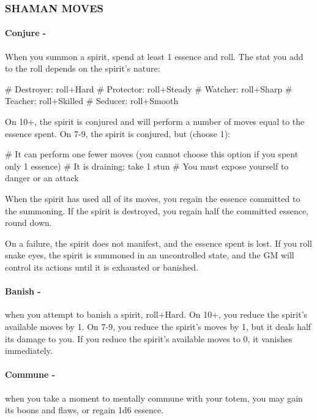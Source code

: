 \subsubsection{SHAMAN MOVES}
\paragraph{Conjure -} When you summon a spirit, spend at least 1 essence and roll. The stat you add to the roll depends on the spirit’s nature:
    \begin{easylist}
        # Destroyer: roll+Hard
        # Protector: roll+Steady
        # Watcher: roll+Sharp
        # Teacher: roll+Skilled
        # Seducer: roll+Smooth
    \end{easylist}

On 10+, the spirit is conjured and will perform a number of moves equal to the essence spent. On 7-9, the spirit is conjured, but (choose 1):
    \begin{easylist}
        # It can perform one fewer moves (you cannot choose this option if you spent only 1 essence)
        # It is draining; take 1 stun
        # You must expose yourself to danger or an attack
    \end{easylist}

When the spirit has used all of its moves, you regain the essence committed to the summoning. If the spirit is destroyed, you regain half the committed essence, round down.

On a failure, the spirit does not manifest, and the essence spent is lost. If you roll snake eyes, the spirit is summoned in an uncontrolled state, and the GM will control its actions until it is exhausted or banished.

\paragraph{Banish -} when you attempt to banish a spirit, roll+Hard. On 10+, you reduce the spirit’s available moves by 1. On 7-9, you reduce the spirit’s moves by 1, but it deals half its damage to you. If you reduce the spirit’s available moves to 0, it vanishes immediately.

\paragraph{Commune -} when you take a moment to mentally commune with your totem, you may gain its boons and flaws, or regain 1d6 essence.

